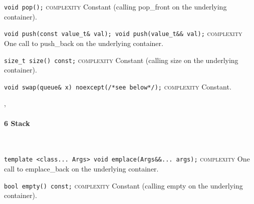 \noindent{}\hspace*{0.25em}\lstinline[basicstyle=\ttfamily\color{cgreen}]{void pop();} \textsc{complexity} Constant (calling pop\_front on the underlying container).\\\vspace{-0.6em}

\noindent{}\hspace*{0.25em}\lstinline{void push(const value_t& val); void push(value_t&& val);} \textsc{complexity} One call to push\_back on the underlying container.\\\vspace{-0.6em}

\noindent{}\hspace*{0.25em}\lstinline[basicstyle=\ttfamily\color{cgreen}]{size_t size() const;} \textsc{complexity} Constant (calling size on the underlying container).\\\vspace{-0.6em}

\noindent{}\hspace*{0.25em}\lstinline[basicstyle=\ttfamily\color{cgreen}]{void swap(queue& x) noexcept(/*see below*/);} \textsc{complexity} Constant.\\\vspace{-0.6em}


\sep
{}
\paragraph{6 Stack}\mbox{}\vspace{0.5em}\\
\noindent{}\hspace*{0.25em}\lstinline{template <class... Args> void emplace(Args&&... args);} \textsc{complexity} One call to emplace\_back on the underlying container.\\\vspace{-0.6em}

\noindent{}\hspace*{0.25em}\lstinline[basicstyle=\ttfamily\color{cgreen}]{bool empty() const;} \textsc{complexity} Constant (calling empty on the underlying container).\\\vspace{-0.6em}

